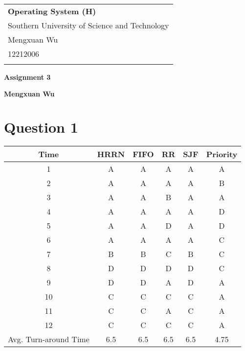 \documentclass[a4paper,12pt]{article}
\begin{document}
\thispagestyle{empty} %

\begin{tabular}{p{15.5cm}}
{\large \bf Operating System (H)} \\
Southern University of Science and Technology \\ Mengxuan Wu \\ 12212006 \\
\hline
\\
\end{tabular}

\vspace*{0.3cm} %

\begin{center}
	{\Large \bf Assignment 3}
	\vspace{2mm}

	{\bf Mengxuan Wu}
		
\end{center}  

\vspace{0.4cm}

\section*{Question 1}

\begin{table}[H]
	\centering
	\begin{tabular}{c|ccccc}
		\toprule
		Time & HRRN & FIFO & RR & SJF & Priority \\
		\midrule
		1	&	A	&	A	&	A	&	A	&	A	\\
		2	&	A	&	A	&	A	&	A	&	B	\\
		3	&	A	&	A	&	B	&	A	&	A	\\
		4	&	A	&	A	&	A	&	A	&	D	\\
		5	&	A	&	A	&	D	&	A	&	D	\\
		6	&	A	&	A	&	A	&	A	&	C	\\
		7	&	B	&	B	&	C	&	B	&	C	\\
		8	&	D	&	D	&	D	&	D	&	C	\\
		9	&	D	&	D	&	A	&	D	&	A	\\
		10	&	C	&	C	&	C	&	C	&	A	\\
		11	&	C	&	C	&	A	&	C	&	A	\\
		12	&	C	&	C	&	C	&	C	&	A	\\
		\midrule
		Avg. Turn-around Time	&	6.5	&	6.5	& 	6.5	&	6.5	& 4.75	\\
		\bottomrule
	\end{tabular}
\end{table}
\end{document}

